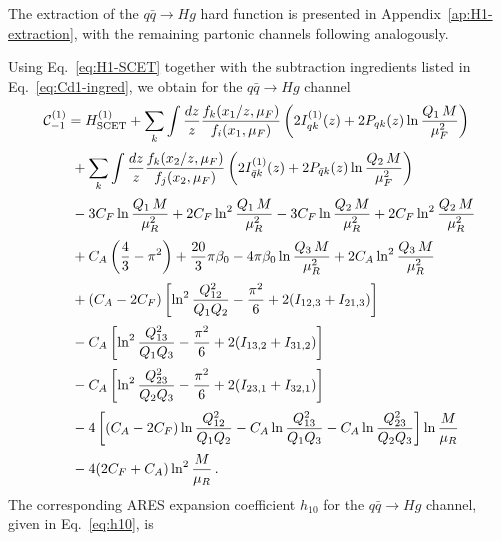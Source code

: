 The extraction of the $q\bar q\to Hg$ hard function is presented in
Appendix~\ref{ap:H1-extraction}, with the remaining partonic channels
following analogously.


Using Eq.~\eqref{eq:H1-SCET} together with the subtraction ingredients
listed in Eq.~\eqref{eq:Cd1-ingred}, we obtain for the
$q\bar{q}\to Hg$ channel
\begin{equation}
\begin{aligned}
&\mathcal{C}^{(1)}_{-1} = H_{\rm SCET}^{(1)}+\sum_{k}\int\frac{dz}{z} \frac{f_k(x_1/z,\mu_F)}{f_i(x_1,\mu_F)}\left(2I_{qk}^{(1)}(z)+2P_{qk}(z)\ln\frac{Q_1\,M}{\mu_F^2}\right)\\[0.5ex]
&\qquad+\sum_{k}\int\frac{dz}{z} \frac{f_k(x_2/z,\mu_F)}{f_j(x_2,\mu_F)}\left(2I_{\bar{q}k}^{(1)}(z)+2P_{\bar{q}k}(z)\ln\frac{Q_2\,M}{\mu_F^2}\right)\\[0.5ex]
&\qquad -3C_F\ln\frac{Q_1\,M}{\mu_R^2}+2C_F\ln^2\frac{Q_1\,M}{\mu_R^2}-3C_F\ln\frac{Q_2\,M}{\mu_R^2}+2C_F\ln^2\frac{Q_2\,M}{\mu_R^2} \\[0.5ex]
&\qquad + C_A\left(\frac{4}{3}-\pi^2\right)+\frac{20}{3}\pi\beta_0-4\pi\beta_0\ln\frac{Q_3\,M}{\mu_R^2}+2C_A\ln^2\frac{Q_3\,M}{\mu_R^2}\\[0.5ex]
&\qquad+(C_A-2C_F)\left[\ln^2\frac{Q_{12}^2}{Q_1 Q_2}-\frac{\pi^2}{6}+2(I_{12,3}+I_{21,3})\right] \\[0.5ex]
&\qquad-C_A\left[\ln^2\frac{Q_{13}^2}{Q_1 Q_3}-\frac{\pi^2}{6}+2(I_{13,2}+I_{31,2})\right] \\[0.5ex]
&\qquad-C_A\left[\ln^2\frac{Q_{23}^2}{Q_2 Q_3}-\frac{\pi^2}{6}+2(I_{23,1}+I_{32,1})\right] \\[0.5ex]
&\qquad -4\left[(C_A-2C_F)\ln\frac{Q_{12}^2}{Q_1Q_2}-C_A\ln\frac{Q_{13}^2}{Q_1Q_3}-C_A\ln\frac{Q_{23}^2}{Q_2Q_3}\right]\ln\frac{M}{\mu_R}\\[0.5ex]
&\qquad -4(2C_F+C_A)\ln^2\frac{M}{\mu_R}\,.
\end{aligned}
\end{equation}
%
The corresponding \textsc{ARES} expansion coefficient $h_{10}$ for the
$q\bar q\to Hg$ channel, given in Eq.~\eqref{eq:h10}, is
